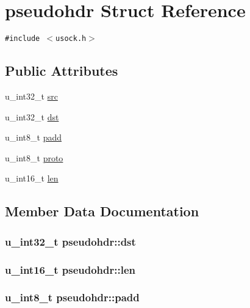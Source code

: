 \hypertarget{structpseudohdr}{
\section{pseudohdr Struct Reference}
\label{structpseudohdr}
}
{\tt \#include $<$usock.h$>$}

\subsection*{Public Attributes}
\begin{CompactItemize}
\item 
u\_\-int32\_\-t \hyperlink{structpseudohdr_c5ae2d59641e771ad3b48a6c29158a87}{src}
\item 
u\_\-int32\_\-t \hyperlink{structpseudohdr_ee1762538b3aaf3d81c7475461795570}{dst}
\item 
u\_\-int8\_\-t \hyperlink{structpseudohdr_c3318d4b453ac87a82cdaa8e384b7bfe}{padd}
\item 
u\_\-int8\_\-t \hyperlink{structpseudohdr_52550c6d13a3557d8d3a947d83f362f6}{proto}
\item 
u\_\-int16\_\-t \hyperlink{structpseudohdr_cb0c71af98d9bd008085860cdb4b43a4}{len}
\end{CompactItemize}


\subsection{Member Data Documentation}
\hypertarget{structpseudohdr_ee1762538b3aaf3d81c7475461795570}{
\subsubsection[{dst}]{\setlength{\rightskip}{0pt plus 5cm}u\_\-int32\_\-t {\bf pseudohdr::dst}}}
\label{structpseudohdr_ee1762538b3aaf3d81c7475461795570}


\hypertarget{structpseudohdr_cb0c71af98d9bd008085860cdb4b43a4}{
\subsubsection[{len}]{\setlength{\rightskip}{0pt plus 5cm}u\_\-int16\_\-t {\bf pseudohdr::len}}}
\label{structpseudohdr_cb0c71af98d9bd008085860cdb4b43a4}


\hypertarget{structpseudohdr_c3318d4b453ac87a82cdaa8e384b7bfe}{
\subsubsection[{padd}]{\setlength{\rightskip}{0pt plus 5cm}u\_\-int8\_\-t {\bf pseudohdr::padd}}}
\label{structpseudohdr_c3318d4b453ac87a82cdaa8e384b7bfe}


